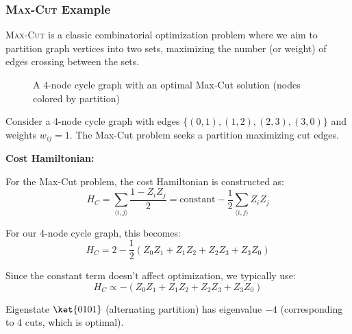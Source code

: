 \subsubsection*{\textsc{Max-Cut} Example}

\textsc{Max-Cut} is a classic combinatorial optimization problem where we aim
to partition graph vertices into two sets, maximizing the number (or weight)
of edges crossing between the sets.

\begin{figure}[h]
  \centering
  \caption{A 4-node cycle graph with an optimal Max-Cut solution (nodes
  colored by partition)}
  \label{fig:max-cut-example}
\end{figure}

Consider a 4-node cycle graph with edges $\{(0,1), (1,2), (2,3), (3,0)\}$ and
weights $w_{ij} = 1$. The Max-Cut problem seeks a partition maximizing cut
edges.

\vspace{0.3cm}

\noindent
\textbf{Cost Hamiltonian:}

For the Max-Cut problem, the cost Hamiltonian is constructed as:
\[
  H_C = \sum_{\langle i,j \rangle} \frac{1 - Z_i Z_j}{2} = \text{constant} -
  \frac{1}{2}\sum_{\langle i,j \rangle} Z_i Z_j
\]

For our 4-node cycle graph, this becomes:
\[
  H_C = 2 - \frac{1}{2}(Z_0 Z_1 + Z_1 Z_2 + Z_2 Z_3 + Z_3 Z_0)
\]

Since the constant term doesn't affect optimization, we typically use:
\[
  H_C \propto -(Z_0 Z_1 + Z_1 Z_2 + Z_2 Z_3 + Z_3 Z_0)
\]

Eigenstate $\ket{0101}$ (alternating partition) has eigenvalue $-4$
(corresponding to 4 cuts, which is optimal).

